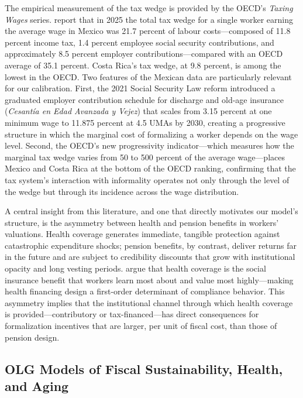 \documentclass[12pt,a4paper]{article}
\begin{document}
The empirical measurement of the tax wedge is provided by the OECD's \textit{Taxing Wages} series. \citet{OECDTaxingWages2026} report that in 2025 the total tax wedge for a single worker earning the average wage in Mexico was 21.7 percent of labour costs---composed of 11.8 percent income tax, 1.4 percent employee social security contributions, and approximately 8.5 percent employer contributions---compared with an OECD average of 35.1 percent. Costa Rica's tax wedge, at 9.8 percent, is among the lowest in the OECD. Two features of the Mexican data are particularly relevant for our calibration. First, the 2021 Social Security Law reform introduced a graduated employer contribution schedule for discharge and old-age insurance (\textit{Cesant\'ia en Edad Avanzada y Vejez}) that scales from 3.15 percent at one minimum wage to 11.875 percent at 4.5 UMAs by 2030, creating a progressive structure in which the marginal cost of formalizing a worker depends on the wage level. Second, the OECD's new progressivity indicator---which measures how the marginal tax wedge varies from 50 to 500 percent of the average wage---places Mexico and Costa Rica at the bottom of the OECD ranking, confirming that the tax system's interaction with informality operates not only through the level of the wedge but through its incidence across the wage distribution.

A central insight from this literature, and one that directly motivates our model's structure, is the asymmetry between health and pension benefits in workers' valuations. Health coverage generates immediate, tangible protection against catastrophic expenditure shocks; pension benefits, by contrast, deliver returns far in the future and are subject to credibility discounts that grow with institutional opacity and long vesting periods. \citet{BaezaPackard2006} argue that health coverage is the social insurance benefit that workers learn most about and value most highly---making health financing design a first-order determinant of compliance behavior. This asymmetry implies that the institutional channel through which health coverage is provided---contributory or tax-financed---has direct consequences for formalization incentives that are larger, per unit of fiscal cost, than those of pension design.

\subsection{OLG Models of Fiscal Sustainability, Health, and Aging}
\label{subsec:lit_olg}
\end{document}
